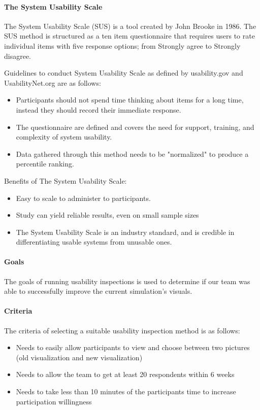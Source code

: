 \paragraph{The System Usability Scale} 
The System Usability Scale (SUS) is a tool created by John Brooke in 1986.
The SUS method is structured as a ten item questionnaire that requires users to rate individual items with five response options; from Strongly agree to Strongly disagree.

Guidelines to conduct System Usability Scale as defined by usability.gov and UsabilityNet.org are as follows:
\begin{itemize}
\item Participants should not spend time thinking about items for a long time, instead they should record their immediate response. \cite{usabilitynet}
\item The questionnaire are defined and covers the need for support, training, and complexity of system usability.
\item Data gathered through this method needs to be "normalized" to produce a percentile ranking.
\end{itemize}

Benefits of The System Usability Scale:
\begin{itemize}
\item Easy to scale to administer to participants.
\item Study can yield reliable results, even on small sample sizes
\item The System Usability Scale is an industry standard, and is credible in differentiating usable systems from unusable ones.
\end{itemize}

\paragraph{Goals}
The goals of running usability inspections is used to determine if our team was able to successfully improve the current simulation's visuals.

\paragraph{Criteria}
The criteria of selecting a suitable usability inspection method is as follows:
\begin{itemize}
\item Needs to easily allow participants to view and choose between two pictures (old visualization and new visualization)
\item Needs to allow the team to get at least 20 respondents within 6 weeks
\item Needs to take less than 10 minutes of the participants time to increase participation willingness
\end{itemize}

